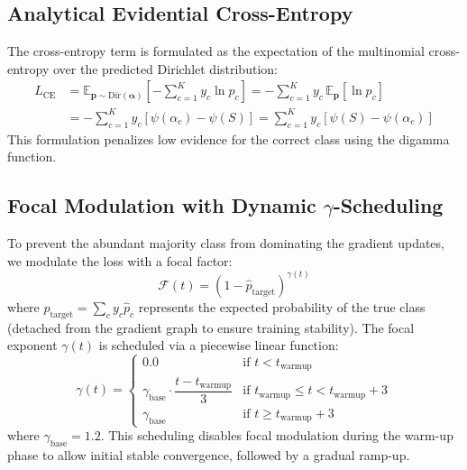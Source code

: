 \documentclass[11pt]{article}
\newcommand{\Dir}{\text{Dir}}
\newcommand{\E}{\mathbb{E}}
\begin{document}
\subsection{Analytical Evidential Cross-Entropy}\label{subsec:ce_term}

The cross-entropy term is formulated as the expectation of the multinomial cross-entropy over the predicted Dirichlet distribution:
\begin{align}
    L_{\text{CE}} &= \E_{\bm{p} \sim \Dir(\bm{\alpha})} \left[ -\sum_{c=1}^K y_c \ln p_c \right] = -\sum_{c=1}^K y_c \, \E_{\bm{p}}[\ln p_c] \nonumber \\
    &= -\sum_{c=1}^K y_c \left[ \psi(\alpha_c) - \psi(S) \right] = \sum_{c=1}^K y_c \left[ \psi(S) - \psi(\alpha_c) \right] \label{eq:ce_digamma}
\end{align}
This formulation penalizes low evidence for the correct class using the digamma function.

\subsection{Focal Modulation with Dynamic $\gamma$-Scheduling}\label{subsec:focal}

To prevent the abundant majority class from dominating the gradient updates, we modulate the loss with a focal factor:
\begin{equation}\label{eq:focal_weight}
    \mathcal{F}(t) = \left(1 - \hat{p}_{\text{target}}\right)^{\gamma(t)}
\end{equation}
where $\hat{p}_{\text{target}} = \sum_c y_c \hat{p}_c$ represents the expected probability of the true class (detached from the gradient graph to ensure training stability). The focal exponent $\gamma(t)$ is scheduled via a piecewise linear function:
\begin{equation}\label{eq:gamma_schedule}
    \gamma(t) = \begin{cases}
        0.0 & \text{if } t < t_{\text{warmup}} \\[4pt]
        \gamma_{\text{base}} \cdot \dfrac{t - t_{\text{warmup}}}{3} & \text{if } t_{\text{warmup}} \le t < t_{\text{warmup}} + 3 \\[4pt]
        \gamma_{\text{base}} & \text{if } t \ge t_{\text{warmup}} + 3
    \end{cases}
\end{equation}
where $\gamma_{\text{base}} = 1.2$. This scheduling disables focal modulation during the warm-up phase to allow initial stable convergence, followed by a gradual ramp-up.
\end{document}
